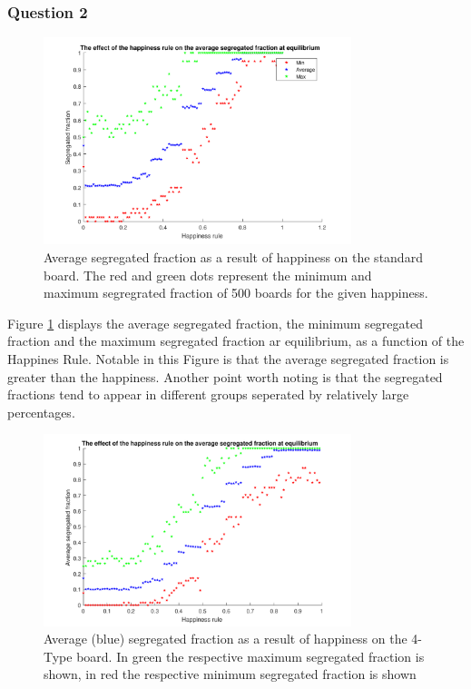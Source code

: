 \subsubsection{Question 2}
\begin{figure}[H]
    \centering
    \includegraphics[width=0.8\textwidth]{habysegfrac_sb_2}
    \caption{Average segregated fraction as a result of happiness on the standard board. The red and green dots represent the minimum and maximum segregrated fraction of 500 boards for the given happiness. }
    \label{fig:happysegsb}
\end{figure}

Figure \ref{fig:happysegsb} displays the average segregated fraction, the minimum segregated fraction and the maximum segregated fraction ar equilibrium, as a function of the Happines Rule.
Notable in this Figure is that the average segregated fraction is greater than the happiness. 
Another point worth noting is that the segregated fractions tend to appear in different groups seperated by relatively large percentages.

\begin{figure}[H]
    \centering
    \includegraphics[width=0.8\textwidth]{habysegfrac_4b_2}
    \caption{Average (blue) segregated fraction as a result of happiness on the 4-Type board. In green the respective maximum segregated fraction is shown, in red the respective minimum segregated fraction is shown}
    \label{fig:happyseg4b}
\end{figure}


